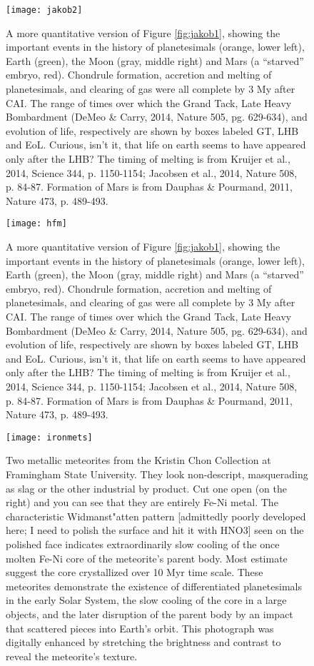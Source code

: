 \begin{figure}[p]
\centering
\texttt{[image: jakob2]}%
\caption{A more quantitative version of Figure \ref{fig:jakob1}, showing the important events in the history of planetesimals (orange, lower left), Earth (green), the Moon (gray, middle right) and Mars (a ``starved'' embryo, red). Chondrule formation, accretion and melting of planetesimals, and clearing of gas were all complete by 3 My after CAI. The range of times over which the Grand Tack, Late Heavy Bombardment (DeMeo \& Carry, 2014, Nature 505, pg. 629-634), and evolution of life, respectively are shown by boxes labeled GT, LHB and EoL. Curious, isn't it, that life on earth seems to have appeared only after the LHB? The timing of melting is from Kruijer et al., 2014, Science 344, p. 1150-1154; Jacobsen et al., 2014, Nature 508, p. 84-87. Formation of Mars is from Dauphas \& Pourmand, 2011, Nature 473, p. 489-493.}  
\label{fig:jakob2}
\end{figure}


\begin{figure}[p]
\centering
\texttt{[image: hfm]}%
\caption{A more quantitative version of Figure \ref{fig:jakob1}, showing the important events in the history of planetesimals (orange, lower left), Earth (green), the Moon (gray, middle right) and Mars (a ``starved'' embryo, red). Chondrule formation, accretion and melting of planetesimals, and clearing of gas were all complete by 3 My after CAI. The range of times over which the Grand Tack, Late Heavy Bombardment (DeMeo \& Carry, 2014, Nature 505, pg. 629-634), and evolution of life, respectively are shown by boxes labeled GT, LHB and EoL. Curious, isn't it, that life on earth seems to have appeared only after the LHB? The timing of melting is from Kruijer et al., 2014, Science 344, p. 1150-1154; Jacobsen et al., 2014, Nature 508, p. 84-87. Formation of Mars is from Dauphas \& Pourmand, 2011, Nature 473, p. 489-493.}  
\label{fig:hfm}
\end{figure}


\begin{figure}[p]
\centering
\texttt{[image: ironmets]}%
\caption{Two metallic meteorites from the Kristin Chon Collection at Framingham State University. They look non-descript, masquerading as slag or the other industrial by product. Cut one open (on the right) and you can see that they are entirely Fe-Ni metal. The characteristic Widmanst"atten pattern [admittedly poorly developed here; I need to polish the surface and hit it with HNO3] seen on the polished face indicates extraordinarily slow cooling of the once molten Fe-Ni core of the meteorite's parent body. Most estimate suggest the core crystallized over 10 Myr time scale. These meteorites demonstrate the existence of differentiated planetesimals in the early Solar System, the slow cooling of the core in a large objects, and the later disruption of the parent body by an impact that scattered pieces into Earth's orbit. This photograph was digitally enhanced by stretching the brightness and contrast to reveal the meteorite's texture.}  
\label{fig:ironmets}
\end{figure}

